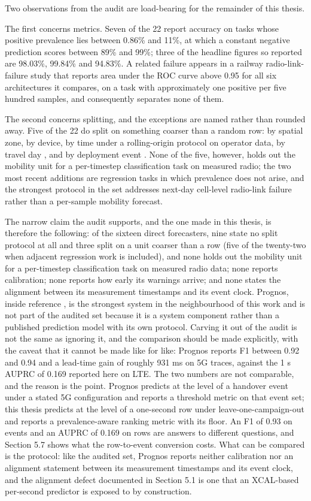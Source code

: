 Two observations from the audit are load-bearing for the remainder of this thesis.

The first concerns metrics. Seven of the 22 report accuracy on tasks whose positive prevalence lies between 0.86\% and 11\%, at which a constant negative prediction scores between 89\% and 99\%; three of the headline figures so reported are 98.03\%, 99.84\% and 94.83\%. A related failure appears in a railway radio-link-failure study that reports area under the ROC curve above 0.95 for all six architectures it compares, on a task with approximately one positive per five hundred samples, and consequently separates none of them.

The second concerns splitting, and the exceptions are named rather than rounded away. Five of the 22 do split on something coarser than a random row: by spatial zone, by device, by time under a rolling-origin protocol on operator data, by travel day \cite{ref10}, and by deployment event \cite{ref11}. None of the five, however, holds out the mobility unit for a per-timestep classification task on measured radio; the two most recent additions are regression tasks in which prevalence does not arise, and the strongest protocol in the set addresses next-day cell-level radio-link failure rather than a per-sample mobility forecast.

The narrow claim the audit supports, and the one made in this thesis, is therefore the following: of the sixteen direct forecasters, nine state no split protocol at all and three split on a unit coarser than a row (five of the twenty-two when adjacent regression work is included), and none holds out the mobility unit for a per-timestep classification task on measured radio data; none reports calibration; none reports how early its warnings arrive; and none states the alignment between its measurement timestamps and its event clock. Prognos, inside reference \cite{ref5}, is the strongest system in the neighbourhood of this work and is not part of the audited set because it is a system component rather than a published prediction model with its own protocol. Carving it out of the audit is not the same as ignoring it, and the comparison should be made explicitly, with the caveat that it cannot be made like for like: Prognos reports F1 between 0.92 and 0.94 and a lead-time gain of roughly 931 ms on 5G traces, against the 1 s AUPRC of 0.169 reported here on LTE. The two numbers are not comparable, and the reason is the point. Prognos predicts at the level of a handover event under a stated 5G configuration and reports a threshold metric on that event set; this thesis predicts at the level of a one-second row under leave-one-campaign-out and reports a prevalence-aware ranking metric with its floor. An F1 of 0.93 on events and an AUPRC of 0.169 on rows are answers to different questions, and Section 5.7 shows what the row-to-event conversion costs. What can be compared is the protocol: like the audited set, Prognos reports neither calibration nor an alignment statement between its measurement timestamps and its event clock, and the alignment defect documented in Section 5.1 is one that an XCAL-based per-second predictor is exposed to by construction.


